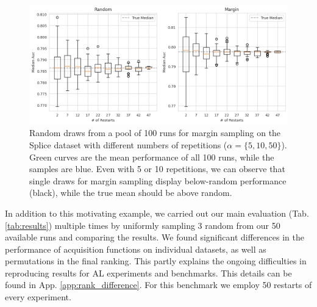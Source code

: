 \documentclass[]{article}
\begin{document}
\begin{figure}
        \hspace{-20mm}
	\includegraphics[width=1.24\linewidth]{img/ablation_restarts}
	\caption{Random draws from a pool of 100 runs for margin sampling on the Splice dataset with different numbers of repetitions ($\alpha=\{5,10,50\}$). Green curves are the mean performance of all 100 runs, while the samples are blue. Even with 5 or 10 repetitions, we can observe that single draws for margin sampling display below-random performance (black), while the true mean should be above random.}
	\label{fig:restarts}
\end{figure}
In addition to this motivating example, we carried out our main evaluation (Tab. \ref{tab:results}) multiple times by uniformly sampling 3 random from our 50 available runs and comparing the results.
We found significant differences in the performance of acquisition functions on individual datasets, as well as permutations in the final ranking.
This partly explains the ongoing difficulties in reproducing results for AL experiments and benchmarks.
This details can be found in App. \ref{app:rank_difference}.
For this benchmark we employ 50 restarts of every experiment.


\end{document}
